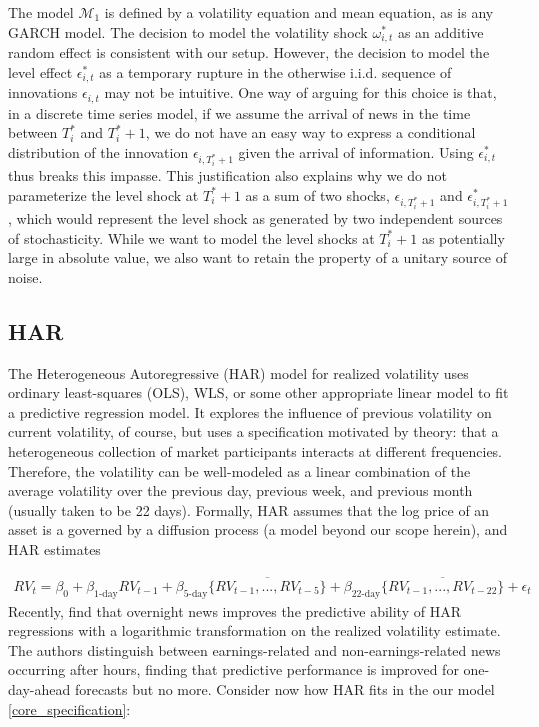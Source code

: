 \documentclass[11pt]{article}
\def\mc#1{\mathcal{#1}} %
\def\mc#1{\mathcal{#1}}
\theoremstyle{definition}
\begin{document}
  The model $\mc{M}_1$ is defined by a volatility equation and mean equation, as is any GARCH model.  The decision to model the volatility shock $\omega^{*}_{i,t}$ as an additive random effect is consistent with our setup.  However, the decision to model the level effect $\epsilon^{*}_{i,t}$ as a temporary rupture in the otherwise i.i.d. sequence of innovations $\epsilon_{i,t}$ may not be intuitive.  One way of arguing for this choice is that, in a discrete time series model, if we assume the arrival of news in the time between $T_{i}^{*}$ and $T_{i}^{*}+1$, we do not have an easy way to express a conditional distribution of the innovation $\epsilon_{i,T_{i}^{*}+1}$ given the arrival of information.  Using $\epsilon^{*}_{i,t}$ thus breaks this impasse.  This justification also explains why we do not parameterize the level shock at $T_{i}^{*}+1$ as a sum of two shocks, $\epsilon_{i,T_{i}^{*}+1}$ and $\epsilon^{*}_{i,T_{i}^{*}+1}$, which would represent the level shock as generated by two independent sources of stochasticity. While we want to model the level shocks at $T_{i}^{*}+1$ as potentially large in absolute value, we also want to retain the property of a unitary source of noise.

\subsection{HAR}

The Heterogeneous Autoregressive (HAR) model for realized volatility \citep{corsi2009simple}  uses ordinary least-squares (OLS), WLS, or some other appropriate linear model to fit a predictive regression model.  It explores the influence of previous volatility on current volatility, of course, but uses a specification motivated by theory: that a heterogeneous collection of market participants interacts at different frequencies.  Therefore, the volatility can be well-modeled as a linear combination of the average volatility over the previous day, previous week, and previous month (usually taken to be 22 days).  Formally, HAR assumes that the log price of an asset is a governed by a diffusion process (a model beyond our scope herein), and HAR estimates

\begin{align*}
RV_{t} = \beta_{0} + \beta_{\text{1-day}}RV_{t-1} + \beta_{\text{5-day}}\overline{\{RV_{t-1},...,RV_{t-5}\}}+\beta_{\text{22-day}}\overline{\{RV_{t-1},...,RV_{t-22}\}} + \epsilon_{t}
\end{align*}
Recently, \cite{bodilsen2023exploiting} find that overnight news improves the predictive ability of HAR regressions with a logarithmic transformation on the realized volatility estimate.  The authors distinguish between earnings-related and non-earnings-related news occurring after hours, finding that predictive performance is improved for one-day-ahead forecasts but no more.  Consider now how HAR fits in the our model \ref{core_specification}:
\end{document}

